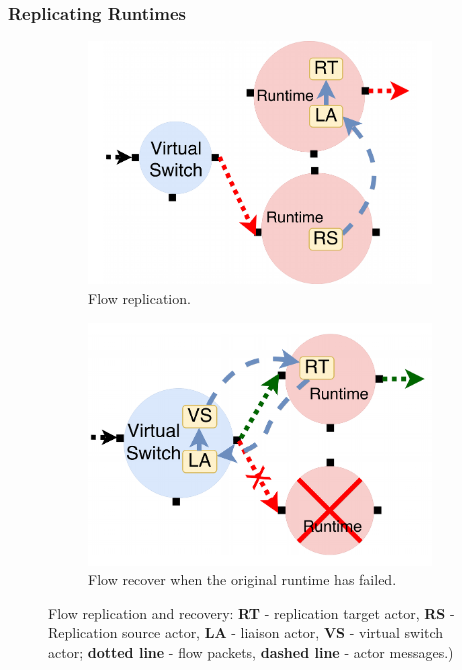 \subsubsection{Replicating Runtimes}%
\label{sec:replicating-runtime}
\begin{figure}[!t]
\begin{subfigure}[t]{0.49\linewidth}
   \centering
   \includegraphics[width=0.66\columnwidth]{figure/nfactor-replication.pdf}
   \caption{Flow replication.}\label{fig:rep}
  \end{subfigure}
  \begin{subfigure}[t]{0.49\linewidth}
     \centering
     \includegraphics[width=0.66\columnwidth]{figure/nfactor-recover.pdf}
     \caption{Flow recover when the original runtime has failed.}\label{fig:recover}
    \end{subfigure}
 \caption{Flow replication and recovery: \textbf{RT} - replication target actor, \textbf{RS} - Replication source actor, \textbf{LA} - liaison actor, \textbf{VS} - virtual switch actor; \textbf{dotted line} - flow packets, \textbf{dashed line} - actor messages.)}
\label{fig:flow-rep}
\end{figure}

